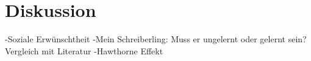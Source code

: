 \section{Diskussion}


-Soziale Erwünschtheit
-Mein Schreiberling: Muss er ungelernt oder gelernt sein? Vergleich mit Literatur
-Hawthorne Effekt
%
